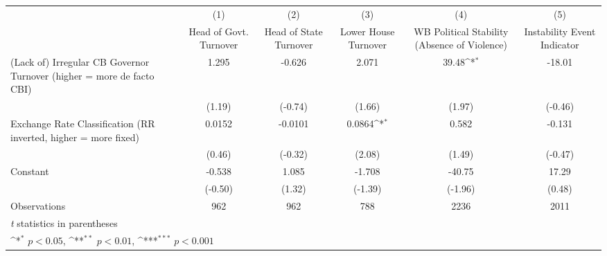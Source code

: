 {
\def\sym#1{\ifmmode^{#1}\else\(^{#1}\)\fi}
\begin{tabular}{l*{5}{c}}
\hline\hline
                &\multicolumn{1}{c}{(1)}&\multicolumn{1}{c}{(2)}&\multicolumn{1}{c}{(3)}&\multicolumn{1}{c}{(4)}&\multicolumn{1}{c}{(5)}\\
                &\multicolumn{1}{c}{Head of Govt. Turnover}&\multicolumn{1}{c}{Head of State Turnover}&\multicolumn{1}{c}{Lower House Turnover}&\multicolumn{1}{c}{WB Political Stability (Absence of Violence)}&\multicolumn{1}{c}{Instability Event Indicator}\\
\hline
(Lack of) Irregular CB Governor Turnover (higher = more de facto CBI)&    1.295         &   -0.626         &    2.071         &    39.48\sym{*}  &   -18.01         \\
                &   (1.19)         &  (-0.74)         &   (1.66)         &   (1.97)         &  (-0.46)         \\
[1em]
Exchange Rate Classification (RR inverted, higher = more fixed)&   0.0152         &  -0.0101         &   0.0864\sym{*}  &    0.582         &   -0.131         \\
                &   (0.46)         &  (-0.32)         &   (2.08)         &   (1.49)         &  (-0.47)         \\
[1em]
Constant        &   -0.538         &    1.085         &   -1.708         &   -40.75         &    17.29         \\
                &  (-0.50)         &   (1.32)         &  (-1.39)         &  (-1.96)         &   (0.48)         \\
\hline
Observations    &      962         &      962         &      788         &     2236         &     2011         \\
\hline\hline
\multicolumn{6}{l}{\footnotesize \textit{t} statistics in parentheses}\\
\multicolumn{6}{l}{\footnotesize \sym{*} \(p<0.05\), \sym{**} \(p<0.01\), \sym{***} \(p<0.001\)}\\
\end{tabular}
}
